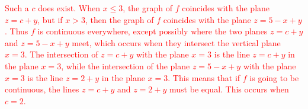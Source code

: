 \documentclass[12pt,reqno]{amsart}
\begin{document}
\bigskip
\textcolor{red}{Such a $c$ does exist. When $x\leq 3$, the graph of $f$ coincides with the plane $z = c+y$, but if $x>3$, then the graph of $f$ coincides with the plane $z=5-x+y$. Thus $f$ is continuous everywhere, except possibly where the two planes $z=c+y$ and $z=5-x+y$ meet, which occurs when they intersect the vertical plane $x=3$. The intersection of $z=c+y$ with the plane $x=3$ is the line $z=c+y$ in the plane $x=3$, while the intersection of the plane $z=5-x+y$ with the plane $x=3$ is the line $z=2+y$ in the plane $x=3$. This means that if $f$ is going to be continuous, the lines $z=c+y$ and $z=2+y$ must be equal. This occurs when $c=2$.}
\bigskip
\end{document}
